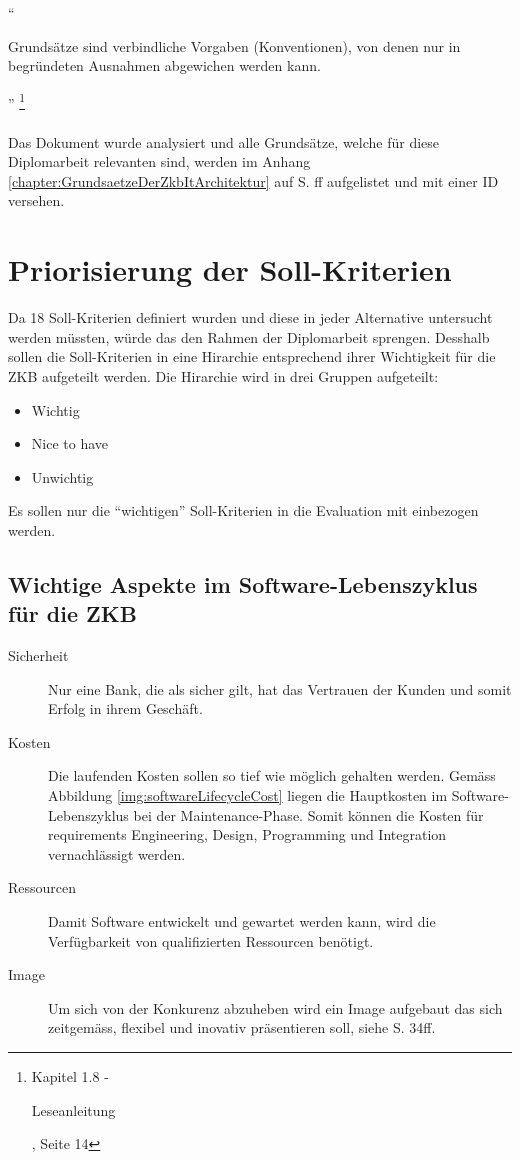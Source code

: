   ``\begin{itshape}Grundsätze sind verbindliche Vorgaben (Konventionen), von
  denen nur in begründeten Ausnahmen abgewichen werden kann.\end{itshape}''
  \footnote{\cite{ZkbHandbuchDerItArchitektur} Kapitel 1.8 -
  \begin{itshape}Leseanleitung\end{itshape}, Seite 14}
  \\
  \\
  \noindent
  Das Dokument wurde analysiert und alle Grundsätze, welche für diese
  Diplomarbeit relevanten sind, werden im Anhang
  \ref{chapter:GrundsaetzeDerZkbItArchitektur}
   auf S.
  \pageref{chapter:GrundsaetzeDerZkbItArchitektur}ff aufgelistet und mit einer
  ID versehen.

  \section{Priorisierung der Soll-Kriterien}
  
  Da 18 Soll-Kriterien definiert wurden und diese in jeder Alternative 
  untersucht werden müssten, würde das den Rahmen der Diplomarbeit sprengen.
  Desshalb sollen die Soll-Kriterien in eine Hirarchie entsprechend ihrer
  Wichtigkeit für die \ac{ZKB} aufgeteilt werden. Die Hirarchie wird in drei
  Gruppen aufgeteilt:
  
  \begin{itemize}
    \item Wichtig
    \item Nice to have
    \item Unwichtig
  \end{itemize}
  
  Es sollen nur die ``wichtigen'' Soll-Kriterien in die Evaluation mit
  einbezogen werden.
  
  \subsection{Wichtige Aspekte im Software-Lebenszyklus für die ZKB}
  
  \begin{description}
    \item[Sicherheit]
    Nur eine Bank, die als sicher gilt, hat das Vertrauen der Kunden und somit
    Erfolg in ihrem Geschäft.
    \item[Kosten]
    Die laufenden Kosten sollen so tief wie möglich gehalten werden. Gemäss
    Abbildung \ref{img:softwareLifecycleCost} liegen die Hauptkosten im
    Software-Lebenszyklus bei der Maintenance-Phase. Somit können die Kosten für
    requirements Engineering, Design, Programming und Integration vernachlässigt
    werden.
    \item[Ressourcen]
    Damit Software entwickelt und gewartet werden kann, wird die Verfügbarkeit
    von qualifizierten Ressourcen benötigt.
    \item[Image]
    Um sich von der Konkurenz abzuheben wird ein Image aufgebaut das sich
    zeitgemäss, flexibel und inovativ präsentieren soll, siehe
    \cite{WillkommenBeiDerZkb} S. 34ff.
  \end{description}
  
